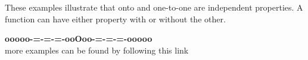 \documentclass{ximera}
\begin{document}
These examples illustrate that onto and one-to-one are independent properties.  A function can have either property with or without the other.


















\begin{onlineOnly}
\begin{center}
\textbf{\textcolor{green!50!black}{ooooo-=-=-=-ooOoo-=-=-=-ooooo}} \\

more examples can be found by following this link\\ 

\end{center}
\end{onlineOnly}
\end{document}
